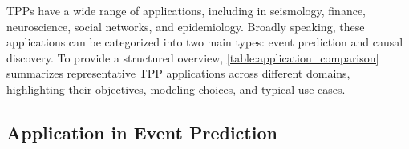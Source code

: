 \documentclass[10pt]{article} %
\begin{document}
TPPs have a wide range of applications, including in seismology, finance, neuroscience, social networks, and epidemiology. Broadly speaking, these applications can be categorized into two main types: event prediction and causal discovery. 
To provide a structured overview, \cref{table:application_comparison} summarizes representative TPP applications across different domains, highlighting their objectives, modeling choices, and typical use cases. 




\subsection{Application in Event Prediction}
\label{application_event}
\end{document}
